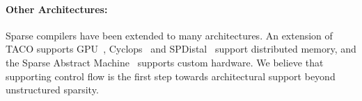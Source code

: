 \paragraph{Other Architectures:} 

Sparse compilers have been extended to many architectures. An extension of TACO supports GPU~\cite{senanayake_sparse_2020}, Cyclops~\cite{solomonik_cyclops_2013,solomonik_sparse_2015} and SPDistal~\cite{yadav_spdistal_2022} support distributed memory, and the Sparse Abstract Machine~\cite{hsu_sparse_2023} supports custom hardware.
We believe that supporting control flow is the first step towards architectural support beyond unstructured sparsity.

%





